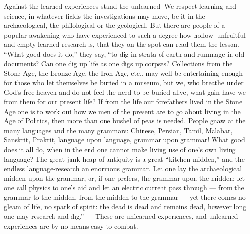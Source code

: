 \documentclass[12pt,a4paper,openany]{book}
\newcommand{\opage}[1]{\marginnote{\footnotesize\textit{[#1]}}}
\begin{document}
Against the learned experiences stand the unlearned. We
respect learning and science, in whatever fields the investigations
may move, be it in the archaeological,
the philological or the geological. But there
are people of a popular awakening who have experienced to such a degree how
hollow, unfruitful and empty learned research is, that they
on the spot can read them the lesson. ``What good does it do,''
they say, ``to dig in strata of earth and rummage in old
documents? Can one dig up life as one digs up
corpses? Collections from the Stone Age, the Bronze Age,
the Iron Age, etc., may well be entertaining enough
for those who let themselves be buried in a museum, but we,
who breathe under God's free heaven and do not feel the need
to be buried alive, what gain have we
from them for our present life? If from the life
our forefathers lived in the Stone Age one is to work out how
we men of the present are to go about
living in the Age of Politics, then more than one
bushel of peas is needed. People gnaw at the many languages and the many
grammars: Chinese, Persian, Tamil,
Malabar, Sanskrit, Prakrit, language upon language,
\setcounter{footnote}{0}%
\opage{41}grammar upon grammar! What good does it all do, when
in the end one cannot make living use
of one's own living language? The great junk-heap of antiquity is
a great ``kitchen midden,'' and the endless language-research
an enormous grammar. Let one lay the archaeological
midden upon the grammar, or, if one prefers, the grammar
upon the midden; let one call physics to one's aid
and let an electric current pass through --- from the grammar
to the midden, from the midden to the grammar
--- yet there comes no gleam of life, no spark of
spirit: the dead is dead and remains dead, however long
one may research and dig.'' --- These are unlearned experiences,
and unlearned experiences are by no means easy to combat.
\end{document}
